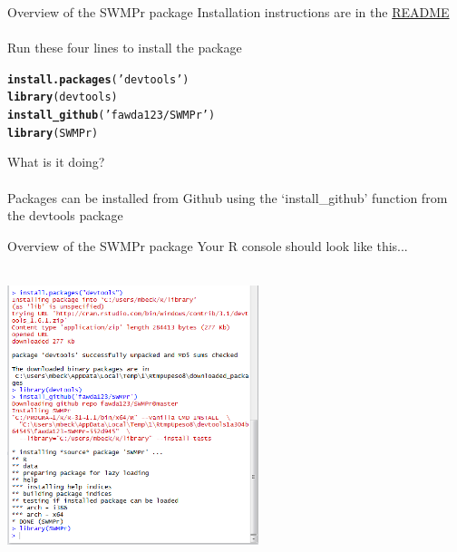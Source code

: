 \documentclass[xcolor=svgnames]{beamer}\usepackage[]{graphicx}\usepackage[]{color}
\makeatletter
\newcommand{\hlstr}[1]{\textcolor[rgb]{0.192,0.494,0.8}{#1}}%
\newcommand{\hlstd}[1]{\textcolor[rgb]{0.345,0.345,0.345}{#1}}%
\newcommand{\hlkwd}[1]{\textcolor[rgb]{0.737,0.353,0.396}{\textbf{#1}}}%
\newenvironment{kframe}{%
 \def\at@end@of@kframe{}%
 \ifinner\ifhmode%
  \def\at@end@of@kframe{\end{minipage}}%
  \begin{minipage}{\columnwidth}%
 \fi\fi%
 \def\FrameCommand##1{\hskip\@totalleftmargin \hskip-\fboxsep
 \colorbox{shadecolor}{##1}\hskip-\fboxsep
     \hskip-\linewidth \hskip-\@totalleftmargin \hskip\columnwidth}%
 \MakeFramed {\advance\hsize-\width
   \@totalleftmargin\z@ \linewidth\hsize
   \@setminipage}}%
 {\par\unskip\endMakeFramed%
 \at@end@of@kframe}
\newenvironment{knitrout}{}{} %
\makeatother
\begin{document}
\begin{frame}[t, fragile]{Overview of the SWMPr package}
Installation instructions are in the \href{https://github.com/fawda123/SWMPr/blob/master/README.md}{README} \\~\\
Run these four lines to install the package
\begin{knitrout}
\color{fgcolor}\begin{kframe}
\begin{alltt}
\hlkwd{install.packages}\hlstd{(}\hlstr{'devtools'}\hlstd{)}
\hlkwd{library}\hlstd{(devtools)}
\hlkwd{install_github}\hlstd{(}\hlstr{'fawda123/SWMPr'}\hlstd{)}
\hlkwd{library}\hlstd{(SWMPr)}
\end{alltt}
\end{kframe}
\end{knitrout}
What is it doing? \\~\\
Packages can be installed from Github using the `install\_github' function from the devtools package
\end{frame}

\begin{frame}[t, fragile]{Overview of the SWMPr package}
Your R console should look like this...\\~\\
\centerline{\includegraphics[width = 0.55\textwidth]{swmpr_install.png}}
\end{frame}
\end{document}
